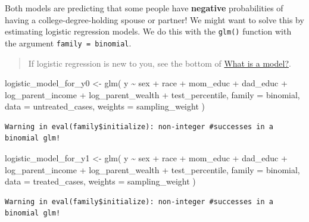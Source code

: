 \documentclass[
  letterpaper,
  DIV=11,
  numbers=noendperiod]{scrartcl}
\newenvironment{Shaded}{\begin{snugshade}}{\end{snugshade}}
\newcommand{\AttributeTok}[1]{\textcolor[rgb]{0.40,0.45,0.13}{#1}}
\newcommand{\FunctionTok}[1]{\textcolor[rgb]{0.28,0.35,0.67}{#1}}
\newcommand{\NormalTok}[1]{\textcolor[rgb]{0.00,0.23,0.31}{#1}}
\newcommand{\OtherTok}[1]{\textcolor[rgb]{0.00,0.23,0.31}{#1}}
\newcommand{\SpecialCharTok}[1]{\textcolor[rgb]{0.37,0.37,0.37}{#1}}
\begin{document}
Both models are predicting that some people have \textbf{negative}
probabilities of having a college-degree-holding spouse or partner! We
might want to solve this by estimating logistic regression models. We do
this with the \texttt{glm()} function with the argument
\texttt{family\ =\ binomial}.

\begin{quote}
If logistic regression is new to you, see the bottom of
\href{what_is_a_model.qmd}{What is a model?}.
\end{quote}

\begin{Shaded}
\begin{Highlighting}[]
\NormalTok{logistic\_model\_for\_y0 }\OtherTok{\textless{}{-}} \FunctionTok{glm}\NormalTok{(}
\NormalTok{  y }\SpecialCharTok{\textasciitilde{}}\NormalTok{ sex }\SpecialCharTok{+}\NormalTok{ race }\SpecialCharTok{+}\NormalTok{ mom\_educ }\SpecialCharTok{+}\NormalTok{ dad\_educ }\SpecialCharTok{+}\NormalTok{ log\_parent\_income }\SpecialCharTok{+}
\NormalTok{    log\_parent\_wealth }\SpecialCharTok{+}\NormalTok{ test\_percentile, }
  \AttributeTok{family =}\NormalTok{ binomial,}
  \AttributeTok{data =}\NormalTok{ untreated\_cases,}
  \AttributeTok{weights =}\NormalTok{ sampling\_weight}
\NormalTok{)}
\end{Highlighting}
\end{Shaded}

\begin{verbatim}
Warning in eval(family$initialize): non-integer #successes in a binomial glm!
\end{verbatim}

\begin{Shaded}
\begin{Highlighting}[]
\NormalTok{logistic\_model\_for\_y1 }\OtherTok{\textless{}{-}} \FunctionTok{glm}\NormalTok{(}
\NormalTok{  y }\SpecialCharTok{\textasciitilde{}}\NormalTok{ sex }\SpecialCharTok{+}\NormalTok{ race }\SpecialCharTok{+}\NormalTok{ mom\_educ }\SpecialCharTok{+}\NormalTok{ dad\_educ }\SpecialCharTok{+}\NormalTok{ log\_parent\_income }\SpecialCharTok{+}
\NormalTok{    log\_parent\_wealth }\SpecialCharTok{+}\NormalTok{ test\_percentile, }
  \AttributeTok{family =}\NormalTok{ binomial,}
  \AttributeTok{data =}\NormalTok{ treated\_cases,}
  \AttributeTok{weights =}\NormalTok{ sampling\_weight}
\NormalTok{)}
\end{Highlighting}
\end{Shaded}

\begin{verbatim}
Warning in eval(family$initialize): non-integer #successes in a binomial glm!
\end{verbatim}
\end{document}

